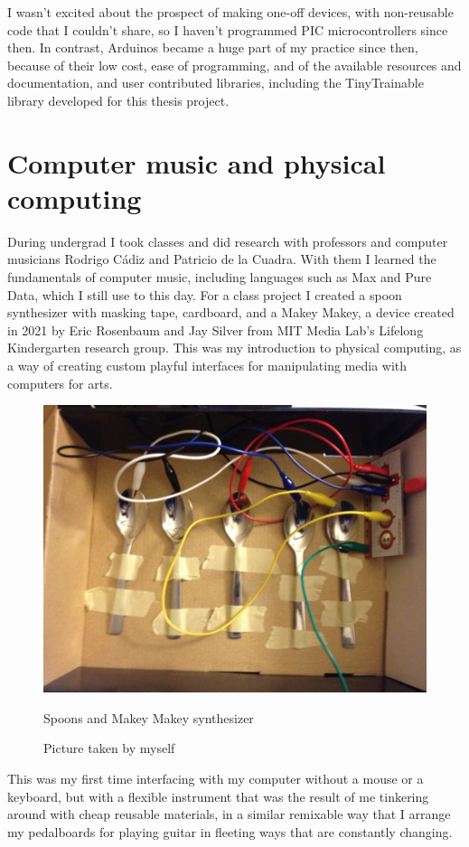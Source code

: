 I wasn't excited about the prospect of making one-off devices, with non-reusable code that I couldn't share, so I haven't programmed PIC microcontrollers since then. In contrast, Arduinos became a huge part of my practice since then, because of their low cost, ease of programming, and of the available resources and documentation, and user contributed libraries, including the TinyTrainable library developed for this thesis project.

\section{Computer music and physical computing}

During undergrad I took classes and did research with professors and computer musicians Rodrigo Cádiz and Patricio de la Cuadra. With them I learned the fundamentals of computer music, including languages such as Max and Pure Data, which I still use to this day. For a class project I created a spoon synthesizer with masking tape, cardboard, and a Makey Makey, a device created in 2021 by Eric Rosenbaum and Jay Silver from MIT Media Lab's Lifelong Kindergarten research group. This was my introduction to physical computing, as a way of creating custom playful interfaces for manipulating media with computers for arts.
 
\begin{figure}[ht]
  \centering
  \includegraphics[width=0.75\linewidth,height=0.25\textheight,keepaspectratio]{images/makey-makey-spoons.jpg}
  \caption{Spoons and Makey Makey synthesizer}
  \caption*{Picture taken by myself}
  \label{fig:makey-makey-spoons}
\end{figure}

This was my first time interfacing with my computer without a mouse or a keyboard, but with a flexible instrument that was the result of me tinkering around with cheap reusable materials, in a similar remixable way that I arrange my pedalboards for playing guitar in fleeting ways that are constantly changing.

